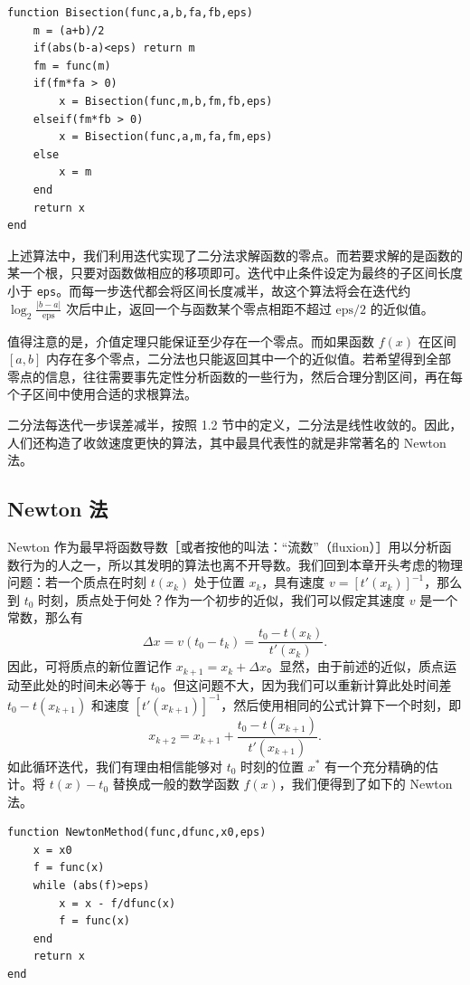 \begin{algorithmBox}
\begin{lstlisting}[style=bellacode]
function Bisection(func,a,b,fa,fb,eps)
    m = (a+b)/2
    if(abs(b-a)<eps) return m
    fm = func(m)
    if(fm*fa > 0)
        x = Bisection(func,m,b,fm,fb,eps)
    elseif(fm*fb > 0)
        x = Bisection(func,a,m,fa,fm,eps)
    else
        x = m
    end
    return x
end
\end{lstlisting}
\end{algorithmBox}

上述算法中，我们利用迭代实现了二分法求解函数的零点。而若要求解的是函数的某一个根，只要对函数做相应的移项即可。迭代中止条件设定为最终的子区间长度小于 \texttt{eps}。而每一步迭代都会将区间长度减半，故这个算法将会在迭代约 $\log_2\frac{|b-a|}{\mathrm{eps}}$ 次后中止，返回一个与函数某个零点相距不超过 $\mathrm{eps}/2$ 的近似值。

值得注意的是，介值定理只能保证至少存在一个零点。而如果函数 $f(x)$ 在区间 $[a,b]$ 内存在多个零点，二分法也只能返回其中一个的近似值。若希望得到全部零点的信息，往往需要事先定性分析函数的一些行为，然后合理分割区间，再在每个子区间中使用合适的求根算法。

二分法每迭代一步误差减半，按照 1.2 节中的定义，二分法是线性收敛的。因此，人们还构造了收敛速度更快的算法，其中最具代表性的就是非常著名的 Newton 法。

\subsection{Newton 法}

Newton 作为最早将函数导数［或者按他的叫法：“流数”（fluxion）］用以分析函数行为的人之一，所以其发明的算法也离不开导数。我们回到本章开头考虑的物理问题：若一个质点在时刻 $t(x_k)$ 处于位置 $x_k$，具有速度 $v=[t'(x_k)]^{-1}$，那么到 $t_0$ 时刻，质点处于何处？作为一个初步的近似，我们可以假定其速度 $v$ 是一个常数，那么有
\[
\Delta x=v(t_0-t_k)=\frac{t_0-t(x_k)}{t'(x_k)}.
\]
因此，可将质点的新位置记作 $x_{k+1}=x_k+\Delta x$。显然，由于前述的近似，质点运动至此处的时间未必等于 $t_0$。但这问题不大，因为我们可以重新计算此处时间差 $t_0-t(x_{k+1})$ 和速度 $[t'(x_{k+1})]^{-1}$，然后使用相同的公式计算下一个时刻，即
\[
x_{k+2}=x_{k+1}+\frac{t_0-t(x_{k+1})}{t'(x_{k+1})}.
\]
如此循环迭代，我们有理由相信能够对 $t_0$ 时刻的位置 $x^*$ 有一个充分精确的估计。将 $t(x)-t_0$ 替换成一般的数学函数 $f(x)$，我们便得到了如下的 Newton 法。

\begin{algorithmBox}
\begin{lstlisting}[style=bellacode]
function NewtonMethod(func,dfunc,x0,eps)
    x = x0
    f = func(x)
    while (abs(f)>eps)
        x = x - f/dfunc(x)
        f = func(x)
    end
    return x
end
\end{lstlisting}
\end{algorithmBox}

